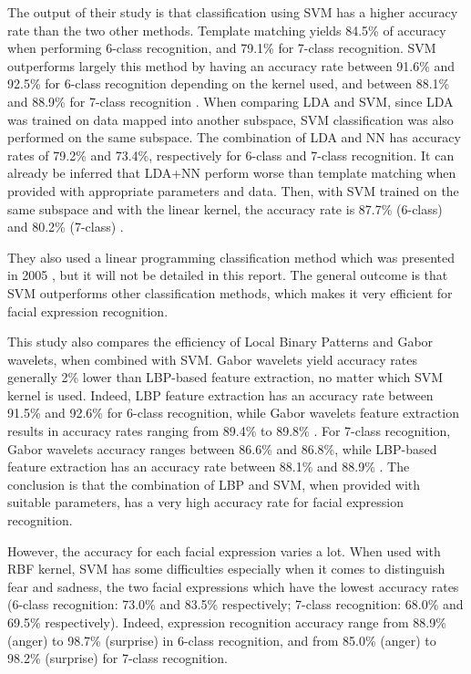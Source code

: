 \noindent The output of their study is that classification using SVM has a higher accuracy rate than the two other methods. Template matching yields 84.5\% of accuracy when performing 6-class recognition, and 79.1\% for 7-class recognition. SVM outperforms largely this method by having an accuracy rate between 91.6\% and 92.5\% for 6-class recognition depending on the kernel used, and between 88.1\% and 88.9\% for 7-class recognition \cite{SHA09}. When comparing LDA and SVM, since LDA was trained on data mapped into another subspace, SVM classification was also performed on the same subspace. The combination of LDA and NN has accuracy rates of 79.2\% and 73.4\%, respectively for 6-class and 7-class recognition. It can already be inferred that LDA+NN perform worse than template matching when provided with appropriate parameters and data. Then, with SVM trained on the same subspace and with the linear kernel, the accuracy rate is 87.7\% (6-class) and 80.2\% (7-class) \cite{SHA09}.
\newline

\noindent They also used a linear programming classification method which was presented in 2005 \cite{FEN05}, but it will not be detailed in this report. The general outcome is that SVM outperforms other classification methods, which makes it very efficient for facial expression recognition.
\newline

\noindent This study also compares the efficiency of Local Binary Patterns and Gabor wavelets, when combined with SVM. Gabor wavelets yield accuracy rates generally 2\% lower than LBP-based feature extraction, no matter which SVM kernel is used. Indeed, LBP feature extraction has an accuracy rate between 91.5\% and 92.6\% for 6-class recognition, while Gabor wavelets feature extraction results in accuracy rates ranging from 89.4\% to 89.8\% \cite{SHA09}. For 7-class recognition, Gabor wavelets accuracy ranges between 86.6\% and 86.8\%, while LBP-based feature extraction has an accuracy rate between 88.1\% and 88.9\% \cite{SHA09}. The conclusion is that the combination of LBP and SVM, when provided with suitable parameters, has a very high accuracy rate for facial expression recognition.
\newline

\noindent However, the accuracy for each facial expression varies a lot. When used with RBF kernel, SVM has some difficulties especially when it comes to distinguish fear and sadness, the two facial expressions which have the lowest accuracy rates (6-class recognition: 73.0\% and 83.5\% respectively; 7-class recognition: 68.0\% and 69.5\% respectively). Indeed, expression recognition accuracy range from 88.9\% (anger) to 98.7\% (surprise) in 6-class recognition, and from 85.0\% (anger) to 98.2\% (surprise) for 7-class recognition.
\newline

